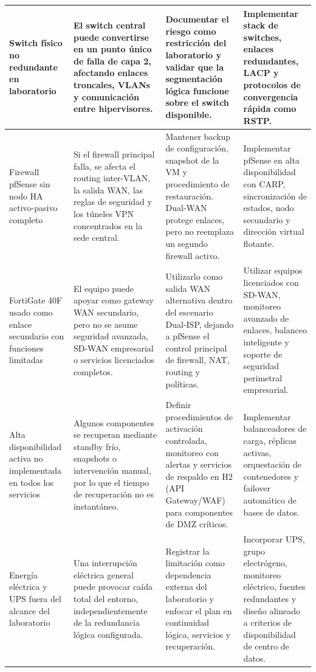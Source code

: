 \documentclass[11pt, a4paper, oneside]{report}
\begin{document}
\begin{landscape}
\begin{xltabular}{\linewidth}{@{}|L{3.8cm}|L{4.5cm}|L{5.5cm}|X|@{}}
{\small Switch físico no redundante en laboratorio} &
{\small El switch central puede convertirse en un punto único de falla de capa 2, afectando enlaces troncales, VLANs y comunicación entre hipervisores.} &
{\small Documentar el riesgo como restricción del laboratorio y validar que la segmentación lógica funcione sobre el switch disponible.} &
{\small Implementar stack de switches, enlaces redundantes, LACP y protocolos de convergencia rápida como RSTP.} \\ \hline

{\small Firewall pfSense sin nodo HA activo-pasivo completo} &
{\small Si el firewall principal falla, se afecta el routing inter-VLAN, la salida WAN, las reglas de seguridad y los túneles VPN concentrados en la sede central.} &
{\small Mantener backup de configuración, snapshot de la VM y procedimiento de restauración. Dual-WAN protege enlaces, pero no reemplaza un segundo firewall activo.} &
{\small Implementar pfSense en alta disponibilidad con CARP, sincronización de estados, nodo secundario y dirección virtual flotante.} \\ \hline

{\small FortiGate 40F usado como enlace secundario con funciones limitadas} &
{\small El equipo puede apoyar como gateway WAN secundario, pero no se asume seguridad avanzada, SD-WAN empresarial o servicios licenciados completos.} &
{\small Utilizarlo como salida WAN alternativa dentro del escenario Dual-ISP, dejando a pfSense el control principal de firewall, NAT, routing y políticas.} &
{\small Utilizar equipos licenciados con SD-WAN, monitoreo avanzado de enlaces, balanceo inteligente y soporte de seguridad perimetral empresarial.} \\ \hline

{\small Alta disponibilidad activa no implementada en todos los servicios} &
{\small Algunos componentes se recuperan mediante standby frío, snapshots o intervención manual, por lo que el tiempo de recuperación no es instantáneo.} &
{\small Definir procedimientos de activación controlada, monitoreo con alertas y servicios de respaldo en H2 (API Gateway/WAF) para componentes de DMZ críticos.} &
{\small Implementar balanceadores de carga, réplicas activas, orquestación de contenedores y failover automático de bases de datos.} \\ \hline

{\small Energía eléctrica y UPS fuera del alcance del laboratorio} &
{\small Una interrupción eléctrica general puede provocar caída total del entorno, independientemente de la redundancia lógica configurada.} &
{\small Registrar la limitación como dependencia externa del laboratorio y enfocar el plan en continuidad lógica, servicios y recuperación.} &
{\small Incorporar UPS, grupo electrógeno, monitoreo eléctrico, fuentes redundantes y diseño alineado a criterios de disponibilidad de centro de datos.} \\ \hline


\end{xltabular}
\end{landscape}
\end{document}
